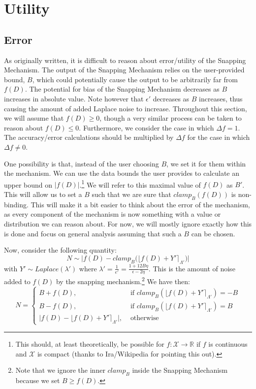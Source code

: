 \documentclass[11pt]{scrartcl} %
\begin{document}
\section{Utility}
\label{sec:utility}

\subsection{Error}
\label{subsec:error}
As originally written, it is difficult to reason about error/utility of the Snapping Mechanism. The output of the Snapping Mechanism relies on the user-provided bound, $B$, which could potentially cause the output to be arbitrarily far from $f(D)$. The potential for bias of the Snapping Mechanism decreases as $B$ increases in absolute value. Note however that $\epsilon'$ decreases as $B$ increases, thus causing the amount of added Laplace noise to increase. Throughout this section, we will assume that $f(D) \geq 0$, though a very similar process can be taken to reason about $f(D) \leq 0$. Furthermore, we consider the case in which $\Delta f = 1$.
The accuracy/error calculations should be multiplied by $\Delta f$ for the case in which $\Delta f \neq 0$. \newline

One possibility is that, instead of the user choosing $B$, we set it for them within the mechanism. We can use the data bounds the user provides to calculate an
upper bound on $\vert f(D) \vert$.\footnote{This should, at least theoretically, be possible for $f: \mathcal{X} \rightarrow \mathbb{R}$ if $f$ is continuous and $\mathcal{X}$ is compact (thanks to Ira/Wikipedia for pointing this out).} We will refer to this maximal value of $f(D)$ as $B'$. This will allow us to set a $B$ such that we are sure that $clamp_B \left( f(D) \right)$ is non-binding. This will make it a bit easier to think about the error of the mechanism, as every component of the mechanism is now something with a value or distribution we can reason about. For now, we will mostly ignore exactly how this is done and focus on general analysis assuming that such a $B$ can be chosen.

Now, consider the following quantity:
\[ N \sim \big \vert f(D) - clamp_B \big( \lfloor f(D) + Y' \rceil_{\Lambda'} \big) \big \vert \]
with $Y' \sim Laplace(\lambda')$ where $\lambda' = \frac{1}{e'} = \frac{1 + 12B \eta}{\epsilon - 2\eta}$. This is the amount of noise added to $f(D)$ by the snapping mechanism.\footnote{Note that we ignore the inner $clamp_B$ inside the Snapping Mechanism because we set $B \geq f(D)$.} We have then:
\begin{equation}
	N =
		\label{snapped_noise}
		\begin{cases}
			B + f(D), &\text{ if } clamp_B \left( \lfloor f(D) + Y' \rceil_{\Lambda'} \right) = -B  \\
			B - f(D), &\text{ if } clamp_B \left( \lfloor f(D) + Y' \rceil_{\Lambda'} \right) = B  \\
			\big\vert f(D) - \lfloor f(D) + Y' \rceil_{\Lambda'} \big\vert, &\text{ otherwise }
		\end{cases}
\end{equation}
\end{document}
